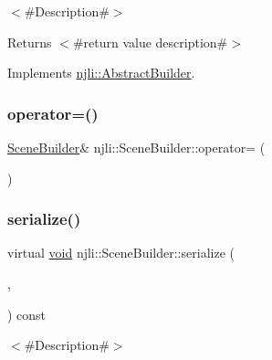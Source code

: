 $<$\#\+Description\#$>$

\begin{DoxyReturn}{Returns}
$<$\#return value description\#$>$ 
\end{DoxyReturn}


Implements \mbox{\hyperlink{classnjli_1_1_abstract_builder_a3e6e553e06d1ca30517ad5fb0bd4d000}{njli\+::\+Abstract\+Builder}}.

\mbox{\label{classnjli_1_1_scene_builder_aa7c6d3a968512f28f965f73bfcd73908}} 
\subsubsection{\texorpdfstring{operator=()}{operator=()}}
{\footnotesize\ttfamily \mbox{\hyperlink{classnjli_1_1_scene_builder}{Scene\+Builder}}\& njli\+::\+Scene\+Builder\+::operator= (\begin{DoxyParamCaption}\item[{const \mbox{\hyperlink{classnjli_1_1_scene_builder}{Scene\+Builder}} \&}]{ }\end{DoxyParamCaption})\hspace{0.3cm}{\ttfamily [protected]}}

\mbox{\label{classnjli_1_1_scene_builder_a3d3c23ac1b1b3a81f24c16a54e1c557f}} 
\subsubsection{\texorpdfstring{serialize()}{serialize()}}
{\footnotesize\ttfamily virtual \mbox{\hyperlink{_thread_8h_af1e856da2e658414cb2456cb6f7ebc66}{void}} njli\+::\+Scene\+Builder\+::serialize (\begin{DoxyParamCaption}\item[{\mbox{\hyperlink{_thread_8h_af1e856da2e658414cb2456cb6f7ebc66}{void}} $\ast$}]{,  }\item[{bt\+Serializer $\ast$}]{ }\end{DoxyParamCaption}) const\hspace{0.3cm}{\ttfamily [virtual]}}

$<$\#\+Description\#$>$


